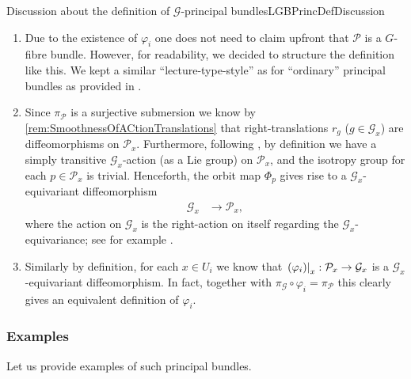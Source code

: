 \documentclass[reqno,a4paper,oneside]{amsart}
\theoremstyle{plain}
\theoremstyle{remark}
\theoremstyle{definition}
\begin{document}
\begin{remarks}{Discussion about the definition of $\mathcal{G}$-principal bundles}{LGBPrincDefDiscussion}
\begin{enumerate}
	We will call such an atlas and its charts a \textbf{principal bundle atlas} and \textbf{principal bundle charts} for $\mathcal{P}$, respectively. For simplicity we may also refer to $\varphi_i$ as principal bundle chart giving rise to the principal bundle atlas.
	\item Due to the existence of $\varphi_i$ one does not need to claim upfront that $\mathcal{P}$ is a $G$-fibre bundle. However, for readability, we decided to structure the definition like this. We kept a similar ``lecture-type-style'' as for ``ordinary'' principal bundles as provided in \cite[\S 4.2, Def.\ 4.2.1, page 207f.]{Hamilton}.
	\item Since $\pi_{\mathcal{P}}$ is a surjective submersion we know by \ref{rem:SmoothnessOfACtionTranslations} that right-translations $r_g$ ($g \in \mathcal{G}_x$) are diffeomorphisms on $\mathcal{P}_{x}$. Furthermore, following \cite[\S 4.2, discussion after Def.\ 4.2.1, page 208f.]{Hamilton}, by definition we have a simply transitive $\mathcal{G}_x$-action (as a Lie group) on $\mathcal{P}_x$, and the isotropy group for each $p \in \mathcal{P}_x$ is trivial. Henceforth, the orbit map $\Phi_p$ gives rise to a $\mathcal{G}_x$-equivariant diffeomorphism
	\begin{align*}
	\mathcal{G}_x &\to \mathcal{P}_x,
	\end{align*}
	where the action on $\mathcal{G}_x$ is the right-action on itself regarding the $\mathcal{G}_x$-equivariance; see for example \cite[\S 3.8, Thm.\ 3.8.8, page 165]{Hamilton}.
	\item Similarly by definition, for each $x \in U_i$ we know that $\mleft.\mleft(\varphi_i\mright)\mright|_x: \mathcal{P}_x \to \mathcal{G}_x$ is a $\mathcal{G}_x$-equivariant diffeomorphism. In fact, together with $\pi_{\mathcal{G}} \circ \varphi_i = \pi_{\mathcal{P}}$ this clearly gives an equivalent definition of $\varphi_i$.
\end{enumerate}
\end{remarks}

\subsubsection{Examples}

Let us provide examples of such principal bundles.
\end{document}
